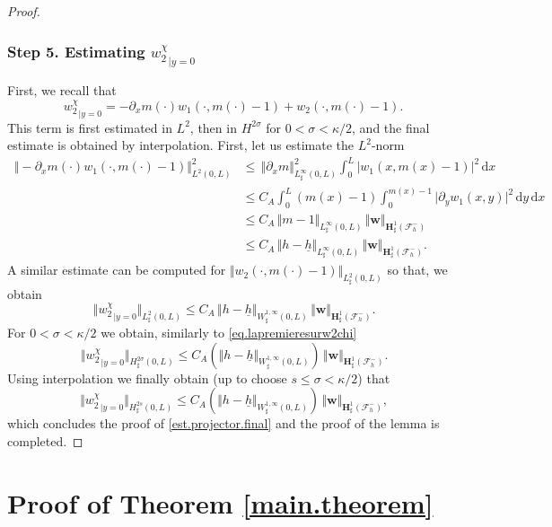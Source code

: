 \documentclass[JEP,XML,SOM,Unicode,NoFloatCountersInSection]{cedram}
\let\mathcal\mathscr
\theoremstyle{remark}
\theoremstyle{definition}
\newcommand{\norme}[1]{\,\Vert #1\Vert}
\newcommand{\vnorme}[1]{\Vert #1\Vert}
\newcommand{\bnorme}[1]{\,\bigl\Vert #1\bigr\Vert}
\newcommand{\dd}{\,\mathrm{d}}
\newcommand{\wg}{\boldsymbol{w}}
\newcommand{\BS}[1]{\boldsymbol{#1}}
\newcommand{\hb}{{\underline{h}}}
\begin{document}
\begin{proof}
\subsubsection*{Step 5. Estimating ${w_{2}^\chi}_{|y=0}$}
First, we recall that
\[
{w_{2}^\chi}_{|{y=0}}=-\partial_x m(\cdot)w_{1}(\cdot,m(\cdot)-1)+w_{2}(\cdot,m(\cdot)-1).
\]
This term is first estimated in $L^2$, then in $H^{2\sigma}$ for $0<\sigma< \kappa/2$, and the final estimate is obtained by interpolation. First, let us estimate the $L^{2}$-norm
\[
\begin{aligned}
\norme{-\partial_x m(\cdot)w_{1}(\cdot,m(\cdot)-1)}_{L^{2}(0,L)}^{2}&{}\leq \norme{\partial_x m}_{L^{\infty}_{\sharp}(0,L)}^{2}\int_{0}^{L}\vert w_{1}(x,m(x)-1)\vert^{2}\dd x\\
&\leq C_{A}\int_{0}^{L}(m(x)-1)\int_{0}^{m(x)-1}\vert\partial_yw_{1}(x,y)\vert^{2}\dd y\dd x\\
&\leq C_{A}\norme{m-1}_{L^{\infty}_{\sharp}(0,L)}\norme{\wg}_{\BS{H}^{1}_{\sharp}(\mathcal{F}^{-}_{h})}\\
&\leq C_{A}\norme{h-\hb}_{L^{\infty}_{\sharp}(0,L)}\norme{\wg}_{\BS{H}^{1}_{\sharp}(\mathcal{F}^{-}_{h})}.
\end{aligned}\]
A similar estimate can be computed for $\vnorme{w_{2}(\cdot,m(\cdot)-1)}_{L^{2}_{\sharp}(0,L)}$ so that, we obtain
\[\bnorme{{w_{2}^\chi}_{|{y=0}}}_{{L}^{2}_{\sharp}(0,L)}\leq C_A\norme{h-\hb}_{W^{1,\infty}_{\sharp}(0,L)}\norme{\wg}_{\BS{H}^{1}_{\sharp}(\mathcal{F}^{-}_{h})}.\]
For $0<\sigma< \kappa/2$ we obtain, similarly to \eqref{eq.lapremieresurw2chi}
\[
\bnorme{{w_{2}^\chi}_{|{y=0}}}_{{H}^{2\sigma}_{\sharp}(0,L)} \leq C_A(\vnorme{h-\hb}_{W^{1,\infty}_{\sharp}(0,L)})\norme{\wg}_{\BS{H}^{1}_{\sharp}(\mathcal{F}^{-}_{h})}.\]
Using interpolation we finally obtain (up to choose $s \leq \sigma < \kappa/2$) that
\[\bnorme{{w_{2}^\chi}_{|{y=0}}}_{H^{2s}_{\sharp}(0,L)}\leq C_A(\vnorme{h-\hb}_{W^{1,\infty}_{\sharp}(0,L)})\norme{\wg}_{\BS{H}^{1}_{\sharp}(\mathcal{F}^{-}_{h})},\]
which concludes the proof of \eqref{est.projector.final} and the proof of the lemma is completed.
\end{proof}

\section{Proof of Theorem \ref{main.theorem}}
\end{document}
